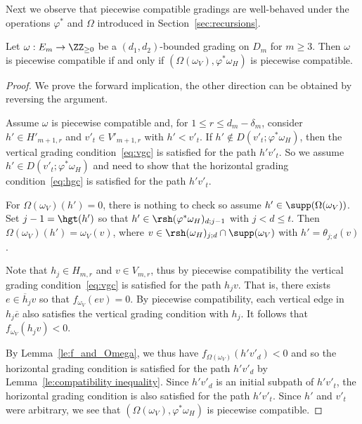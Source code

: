 Next we observe that piecewise compatible gradings are well-behaved under the operations $\varphi^*$ and $\Omega$ introduced in Section~\ref{sec:recursions}.
\begin{proposition}
 \label{prop:piecewise equivalence}
 Let $\omega:E_m\to\ZZ_{\ge0}$ be a $(d_1,d_2)$-bounded grading on $D_m$ for $m\ge3$. 
 Then $\omega$ is piecewise compatible if and only if $(\Omega(\omega_V),\varphi^*\omega_H)$ is piecewise compatible.
\end{proposition} 
\begin{proof}
 We prove the forward implication, the other direction can be obtained by reversing the argument. 

 Assume $\omega$ is piecewise compatible and, for $1\le r\le d_m-\delta_m$, consider $h'\in H'_{m+1,r}$ and $v'_t\in V'_{m+1,r}$ with $h'<v'_t$. 
 If $h'\notin D(v'_t;\varphi^*\omega_H)$, then the vertical grading condition~\eqref{eq:vgc} is satisfied for the path $h'v'_t$. 
 So we assume $h'\in D(v'_t;\varphi^*\omega_H)$ and need to show that the horizontal grading condition~\eqref{eq:hgc} is satisfied for the path $h'v'_t$.

 For $\Omega(\omega_V)(h')=0$, there is nothing to check so assume $h'\in\supp(\Omega(\omega_V))$.
 Set $j-1=\hgt(h')$ so that $h'\in\rsh(\varphi^*\omega_H)_{d;j-1}$ with $j<d\le t$.
 Then $\Omega(\omega_V)(h')=\omega_V(v)$, where $v\in\rsh(\omega_H)_{j;d}\cap\supp(\omega_V)$ with $h'=\theta_{j;d}(v)$.

 Note that $h_j\in H_{m,r}$ and $v\in V_{m,r}$, thus by piecewise compatibility the vertical grading condition~\eqref{eq:vgc} is satisfied for the path $h_jv$. 
 That is, there exists $e\in\overline{h}_jv$ so that $f_{\omega_V}(ev)=0$.
 By piecewise compatibility, each vertical edge in $h_j\overline{e}$ also satisfies the vertical grading condition with $h_j$.
 It follows that $f_{\omega_V}(h_jv)<0$.

 By Lemma~\ref{le:f_and_Omega}, we thus have $f_{\Omega(\omega_V)}(h'v'_d)<0$ and so the horizontal grading condition is satisfied for the path $h'v'_d$ by Lemma~\ref{le:compatibility inequality}.
 Since $h'v'_d$ is an initial subpath of $h'v'_t$, the horizontal grading condition is also satisfied for the path $h'v'_t$. 
 Since $h'$ and $v'_t$ were arbitrary, we see that $(\Omega(\omega_V),\varphi^*\omega_H)$ is piecewise compatible.
\end{proof} 

